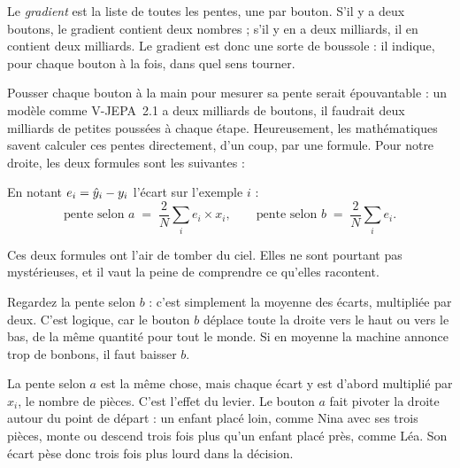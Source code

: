\begin{definition}[Le gradient][gradient]
Le \emph{gradient} est la liste de toutes les pentes, une par bouton. S'il y
a deux boutons, le gradient contient deux nombres ; s'il y en a deux
milliards, il en contient deux milliards. Le gradient est donc une sorte de
boussole : il indique, pour chaque bouton à la fois, dans quel sens tourner.
\end{definition}

Pousser chaque bouton à la main pour mesurer sa pente serait épouvantable :
un modèle comme V-JEPA~2.1 a deux milliards de boutons, il faudrait deux
milliards de petites poussées à chaque étape. Heureusement, les
mathématiques savent calculer ces pentes directement, d'un coup, par une
formule. Pour notre droite, les deux formules sont les suivantes :

\begin{notation}
En notant $e_i = \hat{y}_i - y_i$ l'écart sur l'exemple $i$ :
\[
  \text{pente selon } a \;=\; \frac{2}{N}\sum_i e_i \times x_i,
  \qquad
  \text{pente selon } b \;=\; \frac{2}{N}\sum_i e_i .
\]
\end{notation}

Ces deux formules ont l'air de tomber du ciel. Elles ne sont pourtant pas
mystérieuses, et il vaut la peine de comprendre ce qu'elles racontent.

\begin{intuition}
Regardez la pente selon $b$ : c'est simplement la moyenne des écarts,
multipliée par deux. C'est logique, car le bouton $b$ déplace toute la
droite vers le haut ou vers le bas, de la même quantité pour tout le monde.
Si en moyenne la machine annonce trop de bonbons, il faut baisser $b$.

La pente selon $a$ est la même chose, mais chaque écart y est d'abord
multiplié par $x_i$, le nombre de pièces. C'est l'effet du levier. Le
bouton $a$ fait pivoter la droite autour du point de départ : un enfant
placé loin, comme Nina avec ses trois pièces, monte ou descend trois fois
plus qu'un enfant placé près, comme Léa. Son écart pèse donc trois fois plus
lourd dans la décision.
\end{intuition}

